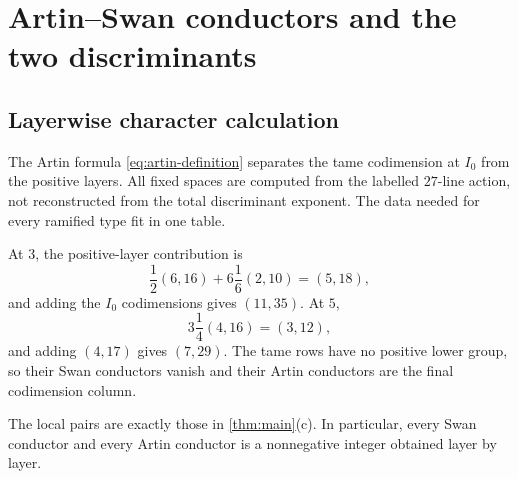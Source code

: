 \section{Artin--Swan conductors and the two discriminants}
\label{sec:conductors}

\subsection{Layerwise character calculation}

The Artin formula \cref{eq:artin-definition} separates the tame codimension
at $I_0$ from the positive layers.  All fixed spaces are computed from the
labelled $27$-line action, not reconstructed from the total discriminant
exponent.  The data needed for every ramified type fit in one table.

\begin{table}[ht]
\centering
\caption{Fixed spaces and weights in the local conductor formula.  A
multiplicity indicates the number of lower layers with that subgroup.}
\label{tab:fixed-space-conductors}
\end{table}

At $3$, the positive-layer contribution is
\[
 \frac12(6,16)+6\frac16(2,10)=(5,18),
\]
and adding the $I_0$ codimensions gives $(11,35)$.  At $5$,
\[
 3\frac14(4,16)=(3,12),
\]
and adding $(4,17)$ gives $(7,29)$.  The tame rows have no positive lower
group, so their Swan conductors vanish and their Artin conductors are the
final codimension column.

\begin{proposition}
\label{prop:local-conductors}
The local pairs are exactly those in \cref{thm:main}(c).  In particular,
every Swan conductor and every Artin conductor is a nonnegative integer
obtained layer by layer.
\end{proposition}

